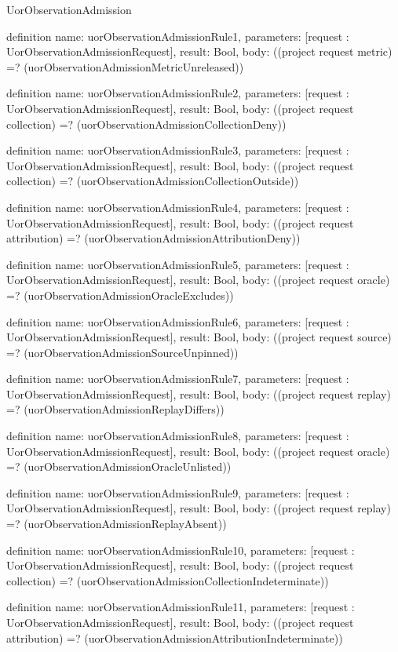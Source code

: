 \begin{lexlean}{UorObservationAdmission}
\begin{semanticmodule}
definition{
  name: uorObservationAdmissionRule1,
  parameters: [request : UorObservationAdmissionRequest],
  result: Bool,
  body: ((project request metric) =? (uorObservationAdmissionMetricUnreleased))
}

definition{
  name: uorObservationAdmissionRule2,
  parameters: [request : UorObservationAdmissionRequest],
  result: Bool,
  body: ((project request collection) =? (uorObservationAdmissionCollectionDeny))
}

definition{
  name: uorObservationAdmissionRule3,
  parameters: [request : UorObservationAdmissionRequest],
  result: Bool,
  body: ((project request collection) =? (uorObservationAdmissionCollectionOutside))
}

definition{
  name: uorObservationAdmissionRule4,
  parameters: [request : UorObservationAdmissionRequest],
  result: Bool,
  body: ((project request attribution) =? (uorObservationAdmissionAttributionDeny))
}

definition{
  name: uorObservationAdmissionRule5,
  parameters: [request : UorObservationAdmissionRequest],
  result: Bool,
  body: ((project request oracle) =? (uorObservationAdmissionOracleExcludes))
}

definition{
  name: uorObservationAdmissionRule6,
  parameters: [request : UorObservationAdmissionRequest],
  result: Bool,
  body: ((project request source) =? (uorObservationAdmissionSourceUnpinned))
}

definition{
  name: uorObservationAdmissionRule7,
  parameters: [request : UorObservationAdmissionRequest],
  result: Bool,
  body: ((project request replay) =? (uorObservationAdmissionReplayDiffers))
}

definition{
  name: uorObservationAdmissionRule8,
  parameters: [request : UorObservationAdmissionRequest],
  result: Bool,
  body: ((project request oracle) =? (uorObservationAdmissionOracleUnlisted))
}

definition{
  name: uorObservationAdmissionRule9,
  parameters: [request : UorObservationAdmissionRequest],
  result: Bool,
  body: ((project request replay) =? (uorObservationAdmissionReplayAbsent))
}

definition{
  name: uorObservationAdmissionRule10,
  parameters: [request : UorObservationAdmissionRequest],
  result: Bool,
  body: ((project request collection) =? (uorObservationAdmissionCollectionIndeterminate))
}

definition{
  name: uorObservationAdmissionRule11,
  parameters: [request : UorObservationAdmissionRequest],
  result: Bool,
  body: ((project request attribution) =? (uorObservationAdmissionAttributionIndeterminate))
}


\end{semanticmodule}
\end{lexlean}
